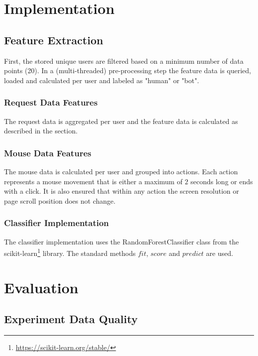 \documentclass[
    fontsize=12pt,
    headings=small,
    parskip=half,           %
    bibliography=totoc,
    numbers=noenddot,       %
    open=any,               %
    final                   %
]{scrreprt}
\begin{document}
\chapter{Implementation}

\section{Feature Extraction}

First, the stored unique users are filtered based on a minimum number of data points (20). In a (multi-threaded) pre-processing step the feature data is queried, loaded and calculated per user and labeled as "human" or "bot".

\subsection{Request Data Features}

The request data is aggregated per user  and the feature data is calculated as described in the  section.

\subsection{Mouse Data Features}

The mouse data is calculated per user and grouped into actions. Each action represents a mouse movement that is either a maximum of $2$ seconds long or ends with a click. It is also ensured that within any action the screen resolution or page scroll position does not change.

\subsection{Classifier Implementation}

The classifier implementation uses the RandomForestClassifier class from the scikit-learn\footnote{\url{https://scikit-learn.org/stable/}} library. The standard methods $fit$, $score$ and $predict$ are used.



\chapter{Evaluation}

\section{Experiment Data Quality}
\end{document}

